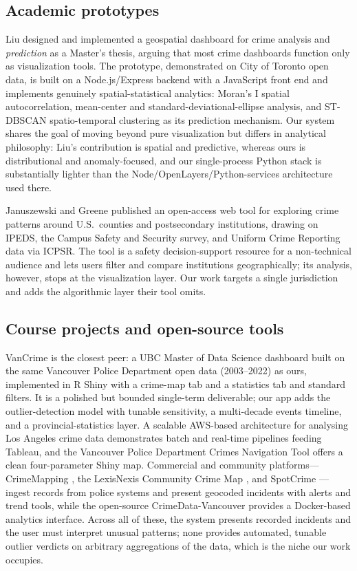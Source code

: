 \documentclass[conference]{IEEEtran}
\begin{document}
\subsection{Academic prototypes}
Liu \cite{liu2020} designed and implemented a geospatial dashboard for crime analysis and \textit{prediction} as a Master's thesis, arguing that most crime dashboards function only as visualization tools. The prototype, demonstrated on City of Toronto open data, is built on a Node.js/Express backend with a JavaScript front end and implements genuinely spatial-statistical analytics: Moran's I spatial autocorrelation, mean-center and standard-deviational-ellipse analysis, and ST-DBSCAN spatio-temporal clustering as its prediction mechanism. Our system shares the goal of moving beyond pure visualization but differs in analytical philosophy: Liu's contribution is spatial and predictive, whereas ours is distributional and anomaly-focused, and our single-process Python stack is substantially lighter than the Node/OpenLayers/Python-services architecture used there.

Januszewski and Greene \cite{januszewski2026} published an open-access web tool for exploring crime patterns around U.S.\ counties and postsecondary institutions, drawing on IPEDS, the Campus Safety and Security survey, and Uniform Crime Reporting data via ICPSR. The tool is a safety decision-support resource for a non-technical audience and lets users filter and compare institutions geographically; its analysis, however, stops at the visualization layer. Our work targets a single jurisdiction and adds the algorithmic layer their tool omits.

\subsection{Course projects and open-source tools}
VanCrime \cite{vancrime} is the closest peer: a UBC Master of Data Science dashboard built on the same Vancouver Police Department open data (2003--2022) as ours, implemented in R Shiny with a crime-map tab and a statistics tab and standard filters. It is a polished but bounded single-term deliverable; our app adds the outlier-detection model with tunable sensitivity, a multi-decade events timeline, and a provincial-statistics layer. A scalable AWS-based architecture for analysing Los Angeles crime data \cite{harrisburg} demonstrates batch and real-time pipelines feeding Tableau, and the Vancouver Police Department Crimes Navigation Tool \cite{umar} offers a clean four-parameter Shiny map. Commercial and community platforms---CrimeMapping \cite{crimemapping}, the LexisNexis Community Crime Map \cite{lexisnexis}, and SpotCrime \cite{spotcrime}---ingest records from police systems and present geocoded incidents with alerts and trend tools, while the open-source CrimeData-Vancouver \cite{crimedatavan} provides a Docker-based analytics interface. Across all of these, the system presents recorded incidents and the user must interpret unusual patterns; none provides automated, tunable outlier verdicts on arbitrary aggregations of the data, which is the niche our work occupies.
\end{document}
